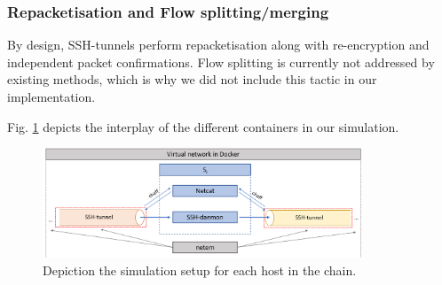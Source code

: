 \documentclass[runningheads,11pt]{llncs}\usepackage[]{graphicx}\usepackage[]{color}
\begin{document}
\subsubsection{Repacketisation and Flow splitting/merging}


By design, SSH-tunnels perform repacketisation along with re-encryption and independent packet confirmations.
Flow splitting is currently not addressed by existing methods, which is why we did not include this tactic in our implementation.

Fig. \ref{Fig:Simulation_setup} depicts the interplay of the different containers in our simulation.

\begin{figure}
\centering
\includegraphics[width=0.85\textwidth]{images/Docker_framework.png}
\caption{Depiction the simulation setup for each host in the chain.}\label{Fig:Simulation_setup}
\end{figure}



 
\end{document}
